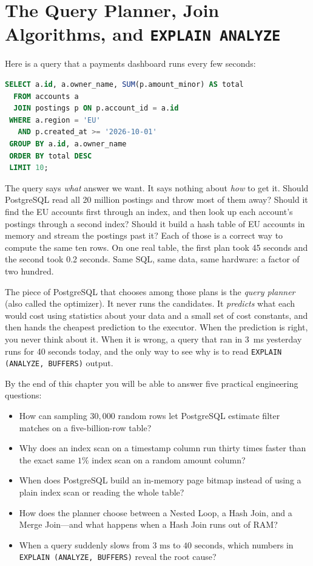 \chapter{The Query Planner, Join Algorithms, and \texttt{EXPLAIN ANALYZE}}

Here is a query that a payments dashboard runs every few seconds:

\begin{lstlisting}[language=SQL]
SELECT a.id, a.owner_name, SUM(p.amount_minor) AS total
  FROM accounts a
  JOIN postings p ON p.account_id = a.id
 WHERE a.region = 'EU'
   AND p.created_at >= '2026-10-01'
 GROUP BY a.id, a.owner_name
 ORDER BY total DESC
 LIMIT 10;
\end{lstlisting}

The query says \emph{what} answer we want. It says nothing about \emph{how} to get it. Should PostgreSQL read all 20 million postings and throw most of them away? Should it find the EU accounts first through an index, and then look up each account's postings through a second index? Should it build a hash table of EU accounts in memory and stream the postings past it? Each of those is a correct way to compute the same ten rows. On one real table, the first plan took 45 seconds and the second took 0.2 seconds. Same SQL, same data, same hardware: a factor of two hundred.

The piece of PostgreSQL that chooses among those plans is the \emph{query planner} (also called the optimizer). It never runs the candidates. It \emph{predicts} what each would cost using statistics about your data and a small set of cost constants, and then hands the cheapest prediction to the executor. When the prediction is right, you never think about it. When it is wrong, a query that ran in 3~ms yesterday runs for 40 seconds today, and the only way to see why is to read \texttt{EXPLAIN (ANALYZE, BUFFERS)} output.

\begin{focusbox}
By the end of this chapter you will be able to answer five practical engineering questions:
\begin{itemize}
  \item How can sampling $30{,}000$ random rows let PostgreSQL estimate filter matches on a five-billion-row table?
  \item Why does an index scan on a timestamp column run thirty times faster than the exact same $1\%$ index scan on a random amount column?
  \item When does PostgreSQL build an in-memory page bitmap instead of using a plain index scan or reading the whole table?
  \item How does the planner choose between a Nested Loop, a Hash Join, and a Merge Join---and what happens when a Hash Join runs out of RAM?
  \item When a query suddenly slows from $3\text{ ms}$ to $40\text{ seconds}$, which numbers in \texttt{EXPLAIN (ANALYZE, BUFFERS)} reveal the root cause?
\end{itemize}
\end{focusbox}

